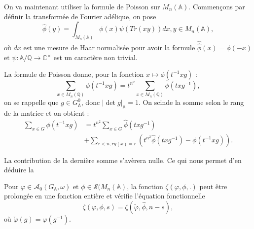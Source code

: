On va maintenant utiliser la formule de Poisson sur $M_n(\mathbb{A})$. Commençons par définir la transformée de Fourier adélique, on pose
\begin{equation}
\hat{\phi}(y) = \int_{M_n(\mathbb{A})} \phi(x)\psi(Tr(xy))dx, y \in M_n(\mathbb{A}),
\end{equation}
où $dx$ est une mesure de Haar normalisée pour avoir la formule $\hat{\hat{\phi}}(x)=\phi(-x)$ et $\psi : \mathbb{A}/\mathbb{Q} \rightarrow \mathbb{C}^\times$ est un caractère non trivial.

La formule de Poisson donne, pour la fonction $x \mapsto \phi(t^{-1}xg)$ :
\begin{equation}
\sum_{x \in M_n(\mathbb{Q})} \phi(t^{-1}xg) = t^{n^2}\sum_{x \in M_n(\mathbb{Q})} \hat{\phi}(txg^{-1}),
\end{equation}
on se rappelle que $g \in G^0_\mathbb{A}$, donc $|\det g|_\mathbb{A}=1$. On scinde la somme selon le rang de la matrice et on obtient :
\begin{equation}
\begin{split}
\sum_{x \in G} \phi(t^{-1}xg) &= t^{n^2}\sum_{x \in G} \hat{\phi}(txg^{-1}) \\
&+ \sum_{r < n, rg(x)=r} \left( t^{n^2}\hat{\phi}(txg^{-1}) - \phi(t^{-1}xg)\right).
\end{split}
\end{equation}

La contribution de la dernière somme s'avèrera nulle. Ce qui nous permet d'en déduire la
\begin{proposition}
Pour $\varphi \in \mathcal{A}_0(G_\mathbb{A}, \omega)$ et $\phi \in \mathcal{S}(M_n(\mathbb{A})$, la fonction $\zeta(\varphi, \phi, .)$ peut être prolongée en une fonction entière et vérifie l'équation fonctionnelle
\begin{equation}
\label{eqcusp}
\zeta(\varphi, \phi, s) = \zeta(\check{\varphi}, \hat{\phi}, n-s),
\end{equation}
où $\check{\varphi}(g)=\varphi(g^{-1})$.
\end{proposition}

